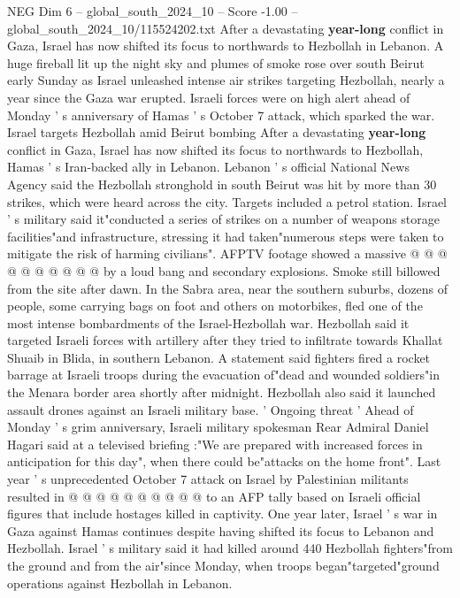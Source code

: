 \begin{textsample}{NEG Dim 6 – global\_south\_2024\_10 – Score -1.00 – global\_south\_2024\_10/115524202.txt}  \label{ex:f6_neg_053}
After a devastating \textbf{year-long} conflict in Gaza, Israel has now shifted its focus to northwards to Hezbollah in Lebanon.
A huge fireball lit up the night sky and plumes of smoke rose over south Beirut early Sunday as Israel unleashed intense air strikes targeting Hezbollah, nearly a year since the Gaza war erupted.
Israeli forces were on high alert ahead of Monday ' s anniversary of Hamas ' s October 7 attack, which sparked the war.
Israel targets Hezbollah amid Beirut bombing After a devastating \textbf{year-long} conflict in Gaza, Israel has now shifted its focus to northwards to Hezbollah, Hamas ' s Iran-backed ally in Lebanon.
Lebanon ' s official National News Agency said the Hezbollah stronghold in south Beirut was hit by more than 30 strikes, which were heard across the city.
Targets included a petrol station.
Israel ' s military said it"conducted a series of strikes on a number of weapons storage facilities"and infrastructure, stressing it had taken"numerous steps were taken to mitigate the risk of harming civilians".
AFPTV footage showed a massive @ @ @ @ @ @ @ @ @ @ by a loud bang and secondary explosions.
Smoke still billowed from the site after dawn.
In the Sabra area, near the southern suburbs, dozens of people, some carrying bags on foot and others on motorbikes, fled one of the most intense bombardments of the Israel-Hezbollah war.
Hezbollah said it targeted Israeli forces with artillery after they tried to infiltrate towards Khallat Shuaib in Blida, in southern Lebanon.
A statement said fighters fired a rocket barrage at Israeli troops during the evacuation of"dead and wounded soldiers"in the Menara border area shortly after midnight.
Hezbollah also said it launched assault drones against an Israeli military base. ' Ongoing threat ' Ahead of Monday ' s grim anniversary, Israeli military spokesman Rear Admiral Daniel Hagari said at a televised briefing :"We are prepared with increased forces in anticipation for this day", when there could be"attacks on the home front".
Last year ' s unprecedented October 7 attack on Israel by Palestinian militants resulted in @ @ @ @ @ @ @ @ @ @ to an AFP tally based on Israeli official figures that include hostages killed in captivity.
One year later, Israel ' s war in Gaza against Hamas continues despite having shifted its focus to Lebanon and Hezbollah.
Israel ' s military said it had killed around 440 Hezbollah fighters"from the ground and from the air"since Monday, when troops began"targeted"ground operations against Hezbollah in Lebanon.

\end{textsample}
